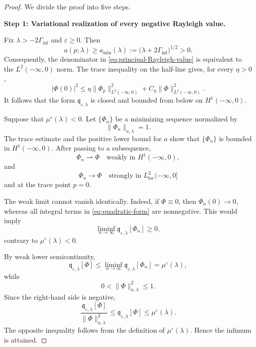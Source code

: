 \documentclass[10pt,a4paper]{amsart}
\begin{document}
\begin{proof}
We divide the proof into five steps.

\medskip
\noindent
\textbf{Step 1: Variational realization of every negative Rayleigh value.}

Fix $\lambda>-2\Gamma_{\inf}$ and $\varepsilon\geq0$.  Then
\[
a(p;\lambda)\geq
a_{\min}(\lambda)
:=
\bigl(\lambda+2\Gamma_{\inf}\bigr)^{1/2}>0.
\]
Consequently, the denominator in
\eqref{eq:principal-Rayleigh-value} is equivalent to the
$L^2(-\infty,0)$ norm.  The trace inequality on the half-line gives,
for every $\eta>0$,
\[
|\Phi(0)|^2
\leq
\eta\|\Phi_p\|_{L^2(-\infty,0)}^2
+
C_\eta\|\Phi\|_{L^2(-\infty,0)}^2.
\]
It follows that the form
$\mathfrak q_{\varepsilon,\lambda}$ is closed and bounded from below on
$H^1(-\infty,0)$.

Suppose that $\mu^\varepsilon(\lambda)<0$.  Let $\{\Phi_n\}$ be a minimizing
sequence normalized by
\[
\|\Phi_n\|_{a,\lambda}=1.
\]
The trace estimate and the positive lower bound for $a$ show that
$\{\Phi_n\}$ is bounded in $H^1(-\infty,0)$.  After passing to a
subsequence,
\[
\Phi_n\rightharpoonup\Phi
\quad\text{weakly in }H^1(-\infty,0),
\]
and
\[
\Phi_n\longrightarrow\Phi
\quad\text{strongly in }L^2_{\mathrm{loc}}(-\infty,0]
\]
and at the trace point $p=0$.

The weak limit cannot vanish identically.  Indeed, if $\Phi\equiv0$,
then $\Phi_n(0)\to0$, whereas all integral terms in
\eqref{eq:quadratic-form} are nonnegative.  This would imply
\[
\liminf_{n\to\infty}
\mathfrak q_{\varepsilon,\lambda}[\Phi_n]\geq0,
\]
contrary to $\mu^\varepsilon(\lambda)<0$.

By weak lower semicontinuity,
\[
\mathfrak q_{\varepsilon,\lambda}[\Phi]
\leq
\liminf_{n\to\infty}
\mathfrak q_{\varepsilon,\lambda}[\Phi_n]
=
\mu^\varepsilon(\lambda),
\]
while
\[
0<\|\Phi\|_{a,\lambda}^2\leq1.
\]
Since the right-hand side is negative,
\[
\frac{\mathfrak q_{\varepsilon,\lambda}[\Phi]}
{\|\Phi\|_{a,\lambda}^2}
\leq
\mathfrak q_{\varepsilon,\lambda}[\Phi]
\leq
\mu^\varepsilon(\lambda).
\]
The opposite inequality follows from the definition of
$\mu^\varepsilon(\lambda)$.  Hence the infimum is attained.


\end{proof}
\end{document}
